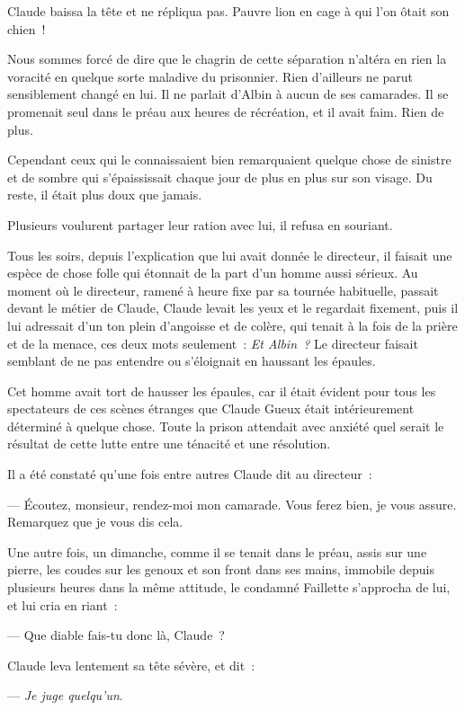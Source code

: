 \documentclass[french,twoside]{book} %
\begin{document}
Claude baissa la tête et ne répliqua pas. Pauvre lion en cage à qui l’on ôtait son chien !\par
Nous sommes forcé de dire que le chagrin de cette séparation n’altéra en rien la voracité en quelque sorte maladive du prisonnier. Rien d’ailleurs ne parut sensiblement changé en lui. Il ne parlait d’Albin à aucun de ses camarades. Il se promenait seul dans le préau aux heures de récréation, et il avait faim. Rien de plus.\par
Cependant ceux qui le connaissaient bien remarquaient quelque chose de sinistre et de sombre qui  s’épaississait chaque jour de plus en plus sur son visage. Du reste, il était plus doux que jamais.\par
Plusieurs voulurent partager leur ration avec lui, il refusa en souriant.\par
Tous les soirs, depuis l’explication que lui avait donnée le directeur, il faisait une espèce de chose folle qui étonnait de la part d’un homme aussi sérieux. Au moment où le directeur, ramené à heure fixe par sa tournée habituelle, passait devant le métier de Claude, Claude levait les yeux et le regardait fixement, puis il lui adressait d’un ton plein d’angoisse et de colère, qui tenait à la fois de la prière et de la menace, ces deux mots seulement : \emph{Et Albin ?} Le directeur faisait semblant de ne pas entendre ou s’éloignait en haussant les épaules.\par
Cet homme avait tort de hausser les épaules, car il était évident pour tous les spectateurs de ces scènes étranges que Claude Gueux était intérieurement déterminé à quelque chose. Toute la prison attendait avec anxiété quel serait le résultat de cette lutte entre une ténacité et une résolution.\par
Il a été constaté qu’une fois entre autres Claude dit au directeur :\par
— Écoutez, monsieur, rendez-moi mon camarade. Vous ferez bien, je vous assure. Remarquez que je vous dis cela.\par
Une autre fois, un dimanche, comme il se tenait dans le préau, assis sur une pierre, les coudes sur les genoux et son front dans ses mains, immobile depuis plusieurs heures dans la même attitude, le condamné  Faillette s’approcha de lui, et lui cria en riant :\par
— Que diable fais-tu donc là, Claude ?\par
Claude leva lentement sa tête sévère, et dit :\par
— \emph{Je juge quelqu’un}.\par
\end{document}
